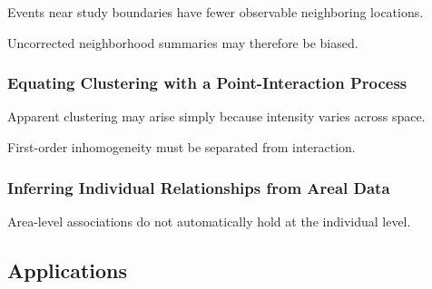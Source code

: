 Events near study boundaries have fewer observable neighboring locations.

Uncorrected neighborhood summaries may therefore be biased.

\subsubsection{Equating Clustering with a Point-Interaction Process}

Apparent clustering may arise simply because intensity varies across
space.

First-order inhomogeneity must be separated from interaction.

\subsubsection{Inferring Individual Relationships from Areal Data}

Area-level associations do not automatically hold at the individual
level.

\subsection{Applications}
\label{subsec:spatial-applications}

